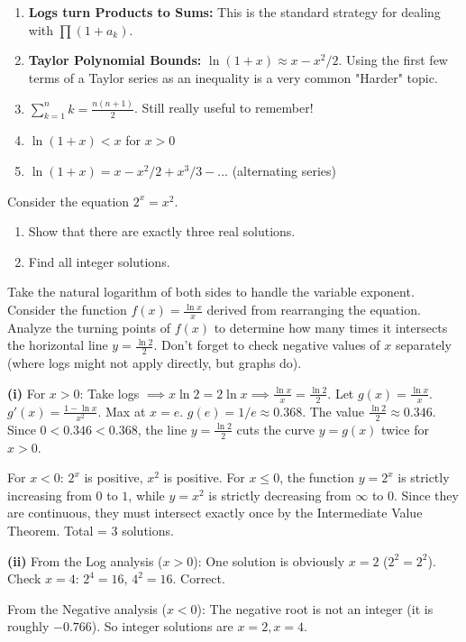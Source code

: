 \begin{takeaways}
\begin{enumerate}
    \item \textbf{Logs turn Products to Sums:} This is the standard strategy for dealing with $\prod (1+a_k)$.
    \item \textbf{Taylor Polynomial Bounds:} $\ln(1+x) \approx x - x^2/2$. Using the first few terms of a Taylor series as an inequality is a very common "Harder" topic.
    \item $\sum_{k=1}^n k = \frac{n(n+1)}{2}$. Still really useful to remember!
    \item $\ln(1 + x) < x$ for $x > 0$
    \item $\ln (1 + x) = x - x^2/2 + x^3/3 - ...$ (alternating series)
\end{enumerate}
\end{takeaways}

\begin{problem}
Consider the equation $2^x = x^2$.
\begin{enumerate}
    \item[(i)] Show that there are exactly three real solutions.
    \item[(ii)] Find all integer solutions.
\end{enumerate}
\end{problem}

\begin{hint}
Take the natural logarithm of both sides to handle the variable exponent.
Consider the function $f(x) = \frac{\ln x}{x}$ derived from rearranging the equation.
Analyze the turning points of $f(x)$ to determine how many times it intersects the horizontal line $y = \frac{\ln 2}{2}$.
Don't forget to check negative values of $x$ separately (where logs might not apply directly, but graphs do).
\end{hint}

\begin{solution}
\textbf{(i)} For $x>0$: Take logs $\implies x \ln 2 = 2 \ln x \implies \frac{\ln x}{x} = \frac{\ln 2}{2}$.
Let $g(x) = \frac{\ln x}{x}$. $g'(x) = \frac{1 - \ln x}{x^2}$. Max at $x=e$.
$g(e) = 1/e \approx 0.368$. The value $\frac{\ln 2}{2} \approx 0.346$.
Since $0 < 0.346 < 0.368$, the line $y = \frac{\ln 2}{2}$ cuts the curve $y=g(x)$ twice for $x>0$.

For $x<0$: $2^x$ is positive, $x^2$ is positive. For $x \le 0$, the function $y = 2^x$ is strictly increasing from $0$ to $1$, while $y = x^2$ is strictly decreasing from $\infty$ to $0$. Since they are continuous, they must intersect exactly once by the Intermediate Value Theorem.
Total = 3 solutions.

\textbf{(ii)}
From the Log analysis ($x>0$):
One solution is obviously $x=2$ ($2^2 = 2^2$).
Check $x=4$: $2^4 = 16$, $4^2 = 16$. Correct.

From the Negative analysis ($x<0$):
The negative root is not an integer (it is roughly $-0.766$).
So integer solutions are $x=2, x=4$.
\end{solution}


